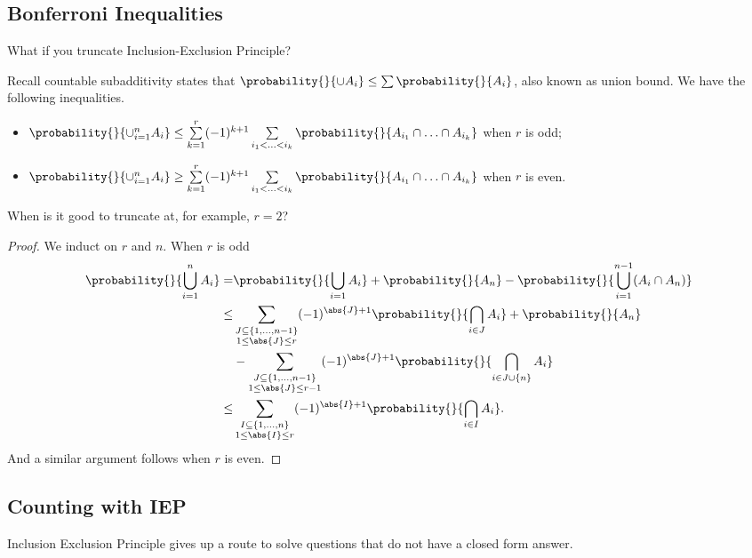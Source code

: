 \subsection{Bonferroni Inequalities}
\begin{problem}
    What if you truncate Inclusion-Exclusion Principle?
\end{problem}
Recall countable subadditivity states that \(\probability{}{\cup A_i}\leq \sum \probability{}{A_i} \), also known as union bound. We have the following inequalities.
\begin{itemize}
    \item \(\probability{}{\cup_{i=1}^n A_i} \leq \sum\limits_{k=1}^{r} (-1)^{k+1}\sum\limits_{i_1 < \ldots < i_k}\probability{}{A_{i_1}\cap \ldots \cap A_{i_k} } \) when \(r\) is odd;
    \item \(\probability{}{\cup_{i=1}^n A_i} \geq \sum\limits_{k=1}^{r} (-1)^{k+1}\sum\limits_{i_1 < \ldots < i_k}\probability{}{A_{i_1}\cap \ldots \cap A_{i_k} } \) when \(r\) is even.
\end{itemize}
\begin{problem}
    When is it good to truncate at, for example, \(r = 2\)?
\end{problem}
\begin{proof}
    We induct on \(r\) and \(n\). When \(r\) is odd
     \begin{align*}
         \probability{}{\bigcup_{i=1}^n A_i} =& \probability{}{\bigcup_{i = 1} A_i} + \probability{}{A_n} - \probability{}{\bigcup_{i=1}^{n-1}(A_i \cap A_n)}\\
         \leq& \sum\limits_{\substack{J\subseteq \{1, \ldots , n - 1\}\\1 \leq  \abs{J} \leq r }} (-1)^{\abs{J} +1}\probability{}{\bigcap_{i\in J} A_i}+\probability{}{A_n} \\
         &- \sum\limits_{\substack{J\subseteq \{1, \ldots , n - 1\}\\1 \leq  \abs{J} \leq r -1}} (-1)^{\abs{J} +1}\probability{}{\bigcap_{i\in J \cup \{n\}} A_i}\\
         \leq& \sum\limits_{\substack{I\subseteq \{1, \ldots , n\}\\1 \leq  \abs{I} \leq r }} (-1)^{\abs{I} +1}\probability{}{\bigcap_{i\in I} A_i}.
     \end{align*}
     And a similar argument follows when \(r\) is even.
\end{proof}
\subsection{Counting with IEP}
Inclusion Exclusion Principle gives up a route to solve questions that do not have a closed form answer.

